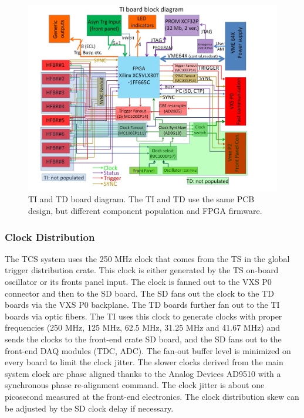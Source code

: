 \begin{figure}[hbt]
	\centering
	\includegraphics[width=1.0\columnwidth,keepaspectratio]{img/TIdiagram.jpg}
	\caption{TI and TD board diagram.  The TI and TD use the same PCB design, but different component population and FPGA firmware.}
	\label{fig:TIdiagram}
\end{figure}


\subsubsection{Clock Distribution}

The TCS system uses the 250 MHz clock that comes from the TS in the global trigger distribution crate.  This clock is either generated by the TS on-board oscillator or its fronts panel input.  The clock is fanned out to the VXS P0 connector and then to the SD board.  The SD fans out the clock to the TD boards via the VXS P0 backplane.  The TD boards further fan out to the TI boards via optic fibers.  The TI uses this clock to generate clocks with proper frequencies (250 MHz, 125 MHz, 62.5 MHz, 31.25 MHz and 41.67 MHz) and sends the clocks to the front-end crate SD board, and the SD fans out to the front-end DAQ modules (TDC, ADC).  The fan-out buffer level is minimized on every board to limit the clock jitter.  The slower clocks derived from the main system clock are phase aligned thanks to the Analog Devices AD9510 with a synchronous phase re-alignment command.  The clock jitter is about one picosecond measured at the front-end electronics.  The clock distribution skew can be adjusted by the SD clock delay if necessary.



